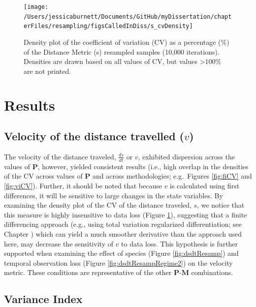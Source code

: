 \documentclass[12pt,twoside,openany]{reedthesis}
\begin{document}
\begin{figure}[bth]

{\centering \texttt{[image: /Users/jessicaburnett/Documents/GitHub/myDissertation/chapterFiles/resampling/figsCalledInDiss/s\_cvDensity]} 

}

\caption{Density plot of the coefficient of variation (CV) as a percentage (\%) of the Distance Metric (s) resampled samples (10,000 iterations). Densities are drawn based on all values of CV, but values \textgreater100\% are not printed.}\label{fig:sCV}
\end{figure}
\hypertarget{results-2}{%
\section{Results}\label{results-2}}

\hypertarget{velocity-of-the-distance-travelled-v}{%
\subsection{\texorpdfstring{Velocity of the distance travelled (\(v\))}{Velocity of the distance travelled (v)}}\label{velocity-of-the-distance-travelled-v}}

The velocity of the distance traveled, \(\frac{ds}{dt}\) or \(v\), exhibited dispersion across the values of \(\textbf{P}\), however, yielded consistent results (i.e., high overlap in the densities of the CV across values of \(\textbf{P}\) and across methodologies; e.g.~Figures \ref{fig:fiCV} and \ref{fig:viCV}). Further, it should be noted that because \(v\) is calculated using first differences, it will be sensitive to large changes in the state variables. By examining the density plot of the CV of the distance traveled, \(s\), we notice that this measure is highly insensitive to data loss (Figure \ref{fig:sCV}), suggesting that a finite differencing approach (e.g., using total variation regularized differentiation; see Chapter ) which can yield a much smoother derivative than the approach used here, may decrease the sensitivity of \(v\) to data loss. This hypothesis is further supported when examining the effect of species (Figure \ref{fig:dsdtResamp}) and temporal observation loss (Figure \ref{fig:dsdtResampRegime2}) on the velocity metric. These conditions are representative of the other \(\textbf{P}\)-\(\textbf{M}\) combinations.

\hypertarget{variance-index}{%
\subsection{Variance Index}\label{variance-index}}
\end{document}
